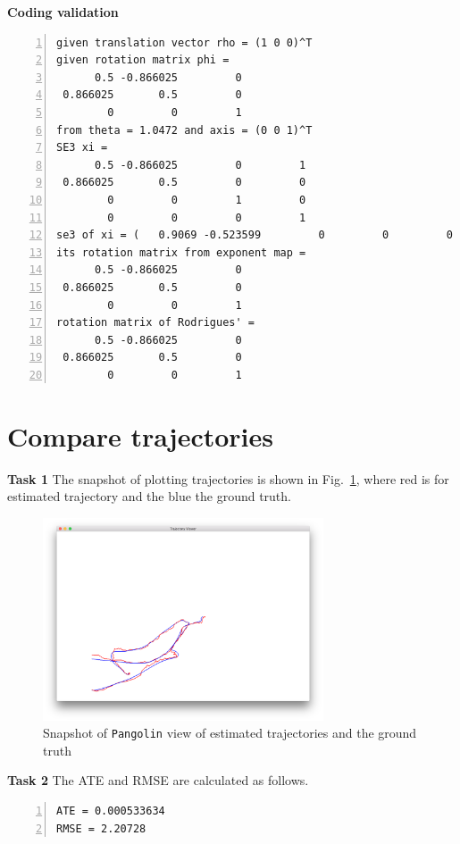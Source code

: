\documentclass[12pt,a4paper]{article}
\begin{document}
    \textsf{\textbf{Coding validation}}
    \begin{lstlisting}[frame=single,numbers=left]
given translation vector rho = (1 0 0)^T
given rotation matrix phi = 
      0.5 -0.866025         0
 0.866025       0.5         0
        0         0         1
from theta = 1.0472 and axis = (0 0 1)^T
SE3 xi = 
      0.5 -0.866025         0         1
 0.866025       0.5         0         0
        0         0         1         0
        0         0         0         1
se3 of xi = (   0.9069 -0.523599         0         0         0    1.0472)^T
its rotation matrix from exponent map = 
      0.5 -0.866025         0
 0.866025       0.5         0
        0         0         1
rotation matrix of Rodrigues' =
      0.5 -0.866025         0
 0.866025       0.5         0
        0         0         1
    \end{lstlisting}


    \section{Compare trajectories}
    \textsf{\textbf{Task 1}}
    The snapshot of plotting trajectories is shown in Fig.~\ref{fig:draw_trajectory},
    where red is for estimated trajectory and the blue the ground truth.
    \begin{figure}[!h]
        \centering
        \includegraphics[height=6cm]{fig/draw_trajectory.png}
        \caption{Snapshot of \texttt{Pangolin} view of estimated trajectories and the ground truth}
        \label{fig:draw_trajectory}
    \end{figure}
    
    \textsf{\textbf{Task 2}}
    The ATE and RMSE are calculated as follows.
    \begin{lstlisting}[frame=single,numbers=left]
ATE = 0.000533634
RMSE = 2.20728
    \end{lstlisting}
    
\end{document}

